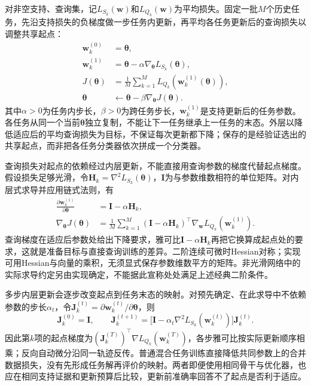 对非空支持、查询集，记$L_{S_k}(\bm w)$和$L_{Q_k}(\bm w)$为平均损失。固定一批$M$个历史任务，先沿支持损失的负梯度做一步任务内更新，再平均各任务更新后的查询损失以调整共享起点：
\begin{align}
  \bm w_k^{(0)}&=\bm{\theta}, \nonumber\\
  \bm w_k^{(1)}&=\bm{\theta}
       -\alpha\nabla_{\bm{\theta}}L_{S_k}(\bm{\theta}),
       \label{eq:ket-transfer-maml-inner}\\
  J(\bm{\theta})&=\frac{1}{M}\sum_{k=1}^{M}
       L_{Q_k}(\bm w_k^{(1)}(\bm{\theta})), \nonumber\\
  \bm{\theta}&\leftarrow\bm{\theta}-\beta\nabla_{\bm{\theta}}J(\bm{\theta}).
       \label{eq:ket-transfer-maml-outer}
\end{align}
其中$\alpha>0$为任务内步长，$\beta>0$为跨任务步长，$\bm w_k^{(1)}$是支持更新后的任务参数。各任务从同一个当前$\bm\theta$独立复制，不能让下一任务继承上一任务的末态。外层以降低适应后的平均查询损失为目标，不保证每次更新都下降；保存的是经验证选出的共享起点，而非把各任务分类器依次拼成一个分类器。

查询损失对起点的依赖经过内层更新，不能直接用查询参数的梯度代替起点梯度。假设损失足够光滑，令$\bm H_k=\nabla^2L_{S_k}(\bm\theta)$，$\bm I$为与参数维数相符的单位矩阵。对内层式求导并应用链式法则，有
\begin{align}
  \frac{\partial\bm w_k^{(1)}}{\partial\bm{\theta}}
     &=\bm I-\alpha\bm H_k, \nonumber\\
  \nabla_{\bm{\theta}}J(\bm{\theta})
     &=\frac{1}{M}\sum_{k=1}^{M}
       (\bm I-\alpha\bm H_k)^{\top}
       \nabla_{\bm w}L_{Q_k}(\bm w_k^{(1)}).
       \label{eq:ket-transfer-maml-chain}
\end{align}
查询梯度在适应后参数处给出下降要求，雅可比$\bm I-\alpha\bm H_k$再把它换算成起点处的要求，这就是准备目标与直接查询训练的差异。二阶连续可微时Hessian对称；实现可用Hessian与向量的乘积，无须显式保存参数维数平方的矩阵。非光滑网络中的实际求导约定另由实现确定，不能据此宣称处处满足上述经典二阶条件。

多步内层更新会逐步改变起点到任务末态的映射。对预先确定、在此求导中不依赖参数的步长$\alpha_t$，令$\bm J_k^{(t)}=\partial\bm w_k^{(t)}/\partial\bm\theta$，则
\[
  \bm J_k^{(0)}=\bm I,\qquad
  \bm J_k^{(t+1)}
  =\bigl[\bm I-\alpha_t\nabla^2L_{S_k}(\bm w_k^{(t)})\bigr]
    \bm J_k^{(t)}.
\]
因此第$k$项的起点梯度为$(\bm J_k^{(T)})^\top\nabla L_{Q_k}(\bm w_k^{(T)})$，各步雅可比按实际更新顺序相乘；反向自动微分沿同一轨迹反传。普通混合任务训练直接降低共同参数上的合并数据损失，没有先形成任务解再评价的映射。两者即便使用相同骨干与优化器，也应在相同支持证据和更新预算后比较，更新前准确率回答不了起点是否利于适应。

